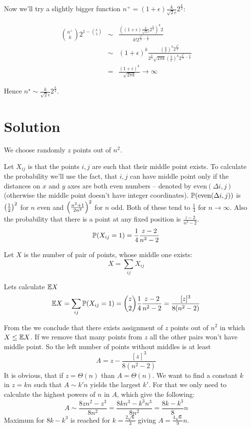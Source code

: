 \documentclass[a4paper]{article}
\begin{document}
Now we'll try a slightly bigger function $ n^+ = (1 + \epsilon) \frac{k}{\sqrt{2}e}2^{\frac{k}{2}} $:

\begin{eqnarray*}
  \binom{n^+}{k} 2^{1-\binom{k}{2}}
  &\sim& \frac{\left((1 + \epsilon)\frac{k}{\sqrt{2}e} 2^{\frac{k}{2}}\right)^k 2}{k! 2^{\frac{k^2}{2}-\frac{k}{2}}} \\
  &\sim& (1 + \epsilon)^k \frac{
              \left(\frac{k}{e}\right)^k 2^\frac{k^2}{2}
          }{
              2^{\frac{k}{2}} \sqrt{2\pi k} \left(\frac{k}{e}\right)^k 2^{\frac{k^2}{2}-\frac{k}{2}}
          } \\
  &=& \frac{(1+\epsilon)^k}{\sqrt{2\pi k}} \longrightarrow \infty
\end{eqnarray*}

Hence $ n^\star \sim \frac{k}{\sqrt{2}e}2^{\frac{k}{2}} $. \endproof

\section{Solution}

We choose randomly $ z $ points out of $ n^2 $.

Let $ X_{ij} $ is \irv that the points $ i, j $ are such that their middle
point exists. To calculate the probability we'll use the fact, that $ i,
j $ can have middle point only if the distances on $ x $ and $ y $ axes are
both even numbers -- denoted by $ \mathrm{even}(\Delta i,j) $ (otherwise the
middle point doesn't have integer coordinates). $ \P(\mathrm{even}(\Delta i,j))
$ is $ \bfrac{1}{2}^2 $ for $ n $ even and $ \bfrac{n^2+1}{2n^2}^2 $ for
$ n $ odd.  Both of these tend to $ \frac{1}{4} $ for $ n \longrightarrow
\infty $. Also the probability that there is a point at any fixed position is
$ \frac{z-2}{n^2-2} $.
$$
  \P(X_{ij} = 1) = \frac{1}{4} \frac{z - 2}{n^2 - 2}
$$

Let $ X $ is the number of pair of points, whose middle one exists: $$ X = \sum_{ij} X_{ij} $$

Lets calculate $ \E X $
$$
  \E X = \sum_{ij} \P(X_{ij} = 1) = \binom{z}{2} \frac{1}{4} \frac{z-2}{n^2-2} = \frac{[z]^3}{8(n^2-2)}
$$

From the \FMM we conclude that there exists assignment of $ z $ points out of
$ n^2 $ in which $ X \le \E X $. If we remove that many points from $ z $ all
the other pairs won't have middle point. So the left number of points without
middles is at least $$ A = z - \frac{[z]^3}{8(n^2-2)} $$ It is obvious, that
if $ z = \Theta(n) $ than $ A = \Theta(n) $. We want to find a constant $ k $ in $ z = kn $ such that $ A \sim k'n $ yields the largest $ k' $. For that we only need to calculate the highest powers of $ n $ in $ A $, which give the following:
$$
  A \sim \frac{8zn^2 - z^3}{8n^2} = \frac{8kn^3 - k^3n^3}{8n^2} = \frac{8k - k^3}{8} n
$$
Maximum for $ 8k - k^3 $ is reached for $ k = \frac{2\sqrt{6}}{3} $ giving $ A = \frac{4\sqrt{6}}{9} n $.
\end{document}
